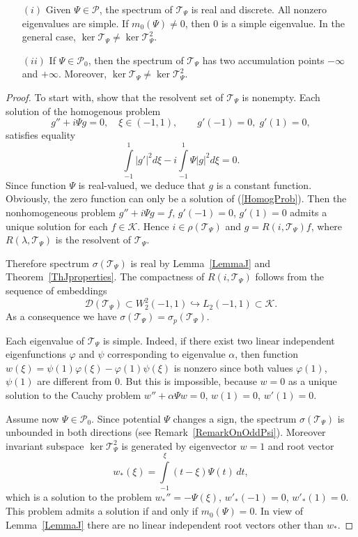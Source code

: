 \documentclass[11pt,english]{amsart}
\begin{document}
\begin{g_theorem}\label{ThSpectrumOfT}\begin{itemize}
\item[$(i)$] Given $\Psi\in \mathcal{P}$, the spectrum of  $\mathcal{T}_\Psi$ is real and discrete.
All nonzero eigenvalues are simple. If $m_0(\Psi)\neq0$, then $0$ is a simple eigenvalue.
In the general case, $\ker \mathcal{T}_\Psi\neq\ker \mathcal{T}_\Psi^2$.

\item[$(ii)$] If $\Psi\in \mathcal{P}_0$, then the spectrum of $\mathcal{T}_\Psi$ has two accumulation points $-\infty$ and $+\infty$. Moreover, $\ker \mathcal{T}_\Psi\neq \ker \mathcal{T}_\Psi^2$.
\end{itemize}
\end{g_theorem}
\begin{proof}
To start with, show that the resolvent set of $\mathcal{T}_\Psi$ is nonempty.
Each solution of the homogenous problem
\begin{equation}
\label{HomogProb}
g''+i\Psi g=0,\quad\xi\in(-1,1),\qquad
g'(-1)=0,\; g'(1)=0,
\end{equation}
satisfies equality
$$
\int\limits_{-1}^1{\left\vert{g'}\right\vert}^2d\xi-i\int\limits_{-1}^1\Psi{\left\vert{g}\right\vert}^2d\xi=0.
$$
Since function $\Psi$ is real-valued, we deduce that $g$ is a constant function.
Obviously, the zero function can only be a solution of (\ref{HomogProb}).
Then the nonhomogeneous problem $g''+i\Psi g=f$, $g'(-1)=0$, $ g'(1)=0$ admits a unique solution
for each $f\in \mathcal{K}$. Hence $i\in \rho(\mathcal{T}_\Psi)$ and $g=R(i,\mathcal{T}_\Psi)f$, where $R(\lambda,\mathcal{T}_\Psi)$ is the resolvent of  $\mathcal{T}_\Psi$.

Therefore spectrum  $\sigma(\mathcal{T}_\Psi)$ is real by
Lemma~\ref{LemmaJ} and Theorem~\ref{ThJproperties}. The compactness of $R(i,\mathcal{T}_\Psi)$ follows from
the sequence of embeddings
$$
\mathcal{D}(\mathcal{T}_\Psi)\subset W_2^2(-1,1)\hookrightarrow L_2(-1,1)\subset
\mathcal{K}.
$$
As a consequence we have $\sigma(\mathcal{T}_\Psi)=\sigma_p(\mathcal{T}_\Psi)$.

Each eigenvalue of $\mathcal{T}_\Psi$ is simple. Indeed, if there exist two linear independent
eigenfunctions $\varphi$ and $\psi$ corresponding to eigenvalue $\alpha$, then function
$w(\xi)=\psi(1)\varphi(\xi)-\varphi(1)\psi(\xi)$ is nonzero since both values
$\varphi(1)$, $\psi(1)$ are different from $0$.
But this is impossible, because $w=0$ as a unique solution to the Cauchy problem $w''+\alpha\Psi w=0$, $w(1)=0$, $w'(1)=0$.

Assume now $\Psi\in \mathcal{P}_0$. Since potential $\Psi$ changes a sign,  the spectrum  $\sigma(\mathcal{T}_\Psi)$ is unbounded  in both directions \cite{CurJDE} (see Remark~\ref{RemarkOnOddPsi}).
Moreover  invariant subspace  $\ker \mathcal{T}_\Psi^2$ is generated by eigenvector $w=1$ and root vector
$$
w_*(\xi)=\int\limits_{-1}^{\xi}(t-\xi)\Psi(t)\,dt,
$$
which is a solution to the problem $w_*''=-\Psi(\xi)$, $w'_*(-1)=0$, $w'_*(1)=0$.
This problem admits a solution if and only if $m_0(\Psi)=0$. In view of Lemma~\ref{LemmaJ} there are no linear independent root  vectors other than $w_*$.
\end{proof}
\end{document}
